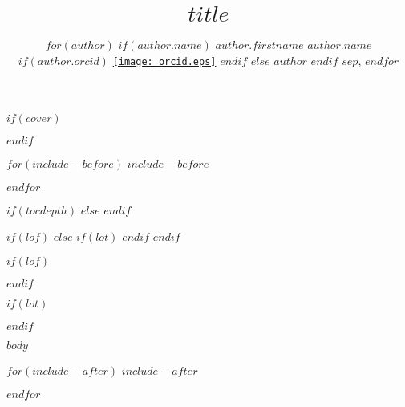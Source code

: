 \documentclass[twoside]{extreport}
\title{$title$}
\author{
$for(author)$
   $if(author.name)$
      $author.firstname$ $author.name$
      $if(author.orcid)$
         \href{https://orcid.org/$author.orcid$}{\texttt{[image: orcid.eps]}}
      $endif$
   $else$
      $author$
   $endif$
$sep$,
$endfor$}
\begin{document}
$if(cover)$

$endif$
\maketitle
{}

$for(include-before)$
$include-before$

$endfor$


\clearpage

$if(tocdepth)$
\setcounter{tocdepth}{$tocdepth$}
$else$
\setcounter{tocdepth}{3}
$endif$
\tableofcontents
{}

$if(lof)$
\clearpage
$else$
  $if(lot)$
\clearpage
  $endif$
$endif$

$if(lof)$
\listoffigures
{}
\vspace{34pt}
$endif$

$if(lot)$
\listoftables
{}
$endif$

\clearpage


$body$

$for(include-after)$
$include-after$

$endfor$
\end{document}
